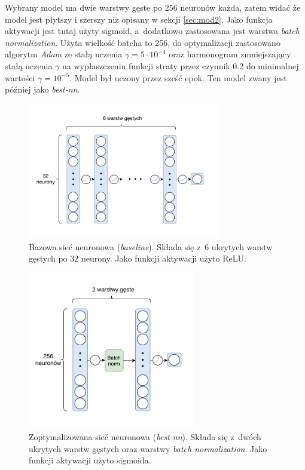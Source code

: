 \documentclass{pracalicmgr}
\begin{document}
	Wybrany model ma dwie warstwy gęste po 256 neuronów każda, zatem widać że model jest płytszy i szerszy niż opisany w sekcji \ref{sec:mod2}. Jako funkcja aktywacji jest tutaj użyty sigmoid, a~dodatkowo zastosowana jest warstwa \textit{batch normalization}. Użyta wielkość batcha to 256, do optymalizacji zastosowano algorytm \textit{Adam} ze stałą uczenia $\gamma = 5\cdot 10^{-4}$ oraz harmonogram zmniejszający stałą uczenia $\gamma$ na wypłaszczeniu funkcji straty przez czynnik 0.2 do minimalnej wartości $\gamma = 10^{-5}$. Model był uczony przez sześć epok. Ten model zwany jest później jako \textit{best-nn}.

	\begin{figure}[H]
	\centering
	\includegraphics[width=0.75\textwidth]{neural_net.pdf}
	\caption{Bazowa sieć neuronowa (\textit{baseline}). Składa się z~6 ukrytych warstw gęstych po 32 neurony. Jako funkcji aktywacji użyto ReLU.}
	\label{fig:nn1}
	\end{figure}
	
	\begin{figure}[H]
	\centering
	\includegraphics[width=0.65\textwidth]{best_neural_net.pdf}
	\caption{Zoptymalizowana sieć neuronowa (\textit{best-nn}). Składa się z~dwóch ukrytych warstw gęstych oraz warstwy \textit{batch normalization}. Jako funkcji aktywacji użyto sigmoida.}
	\label{fig:nn2}
	\end{figure}
\end{document}
